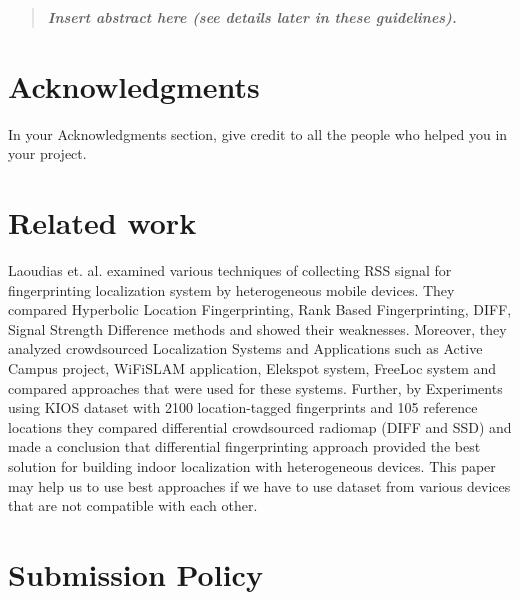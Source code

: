 \documentclass[]{final_report}
\begin{document}
\maketitle

\tableofcontents
\newpage


\begin{abstract}

\textbf{\textsl{Insert abstract here (see details later in these guidelines).}}

\end{abstract}
\newpage


\chapter*{Acknowledgments}

In your Acknowledgments section, give credit to all the people who helped you in your project.


\chapter{Related work}
Laoudias et. al.\cite{Laoudia:2013} examined various techniques of collecting RSS signal for fingerprinting localization system by heterogeneous mobile devices. They compared Hyperbolic Location Fingerprinting, Rank Based Fingerprinting, DIFF, Signal Strength Difference methods and showed their weaknesses. Moreover, they analyzed crowdsourced Localization Systems and Applications such as Active Campus project, WiFiSLAM application, Elekspot system, FreeLoc system and compared approaches that were used for these systems. Further, by Experiments using KIOS dataset with 2100 location-tagged fingerprints and 105 reference locations they compared differential crowdsourced radiomap (DIFF and SSD) and made a conclusion that differential fingerprinting approach provided the best solution for building indoor localization with heterogeneous devices. This paper may help us to use best approaches if we have to use dataset from various devices that are not compatible with each other. 

\chapter{\label{chapter2}Submission Policy}
\end{document}
